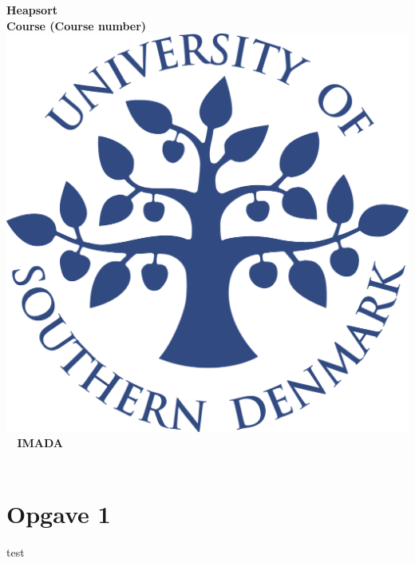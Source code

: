 \documentclass[a4paper,10pt,titlepage]{report}
\date{}
\begin{document}
\begin{titlepage}
\centering
    \vspace*{9\baselineskip}
    \huge
    \bfseries
    Heapsort \\

    \normalfont
	\huge
    Course (Course number)  \\[4\baselineskip]
    \normalfont
	\includegraphics[scale=0.2]{SDU_logo}
    \vfill\
    \vspace{5mm}
    IMADA \\
    \vspace{5mm}
    \textbf{\datedate}  \bf{} \\[2\baselineskip]
\end{titlepage}

\renewcommand{\thepage}{\roman{page}}%
\tableofcontents

\newpage
\setcounter{page}{1}
\renewcommand{\thepage}{\arabic{page}}
\section{Opgave 1}

test
\end{document}
